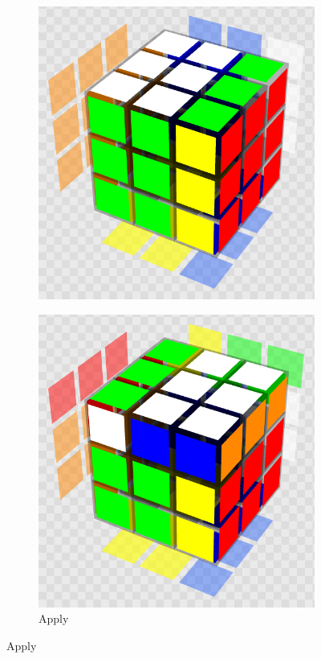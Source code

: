 \begin{figure}[h]
\begin{subfigure}{0.25\textwidth}
        \includegraphics[width=.90\linewidth]{Figures/2 Background/R.png}
    \end{subfigure}%
    \begin{subfigure}{0.25\textwidth}
        \centering
        \caption{Apply }
        \label{fig:notation-demo-u2}
        \includegraphics[width=.90\linewidth]{Figures/2 Background/U2.png}

\end{subfigure}
\end{figure}
